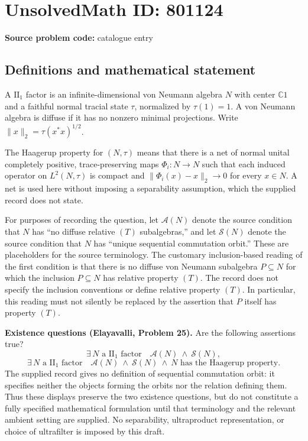 \documentclass[11pt]{article}
\newcommand{\C}{\mathbb{C}}
\begin{document}
\section*{UnsolvedMath ID: 801124}
\textbf{Source problem code:} catalogue entry
\subsection{Definitions and mathematical statement}
A \(\mathrm{II}_1\) factor is an infinite-dimensional von Neumann algebra \(N\) with center \(\C 1\) and a faithful normal tracial state \(\tau\), normalized by \(\tau(1)=1\). A von Neumann algebra is diffuse if it has no nonzero minimal projections. Write \(\|x\|_2=\tau(x^*x)^{1/2}\).

The Haagerup property for \((N,\tau)\) means that there is a net of normal unital completely positive, trace-preserving maps \(\Phi_i:N\to N\) such that each induced operator on \(L^2(N,\tau)\) is compact and \(\|\Phi_i(x)-x\|_2\to0\) for every \(x\in N\). A net is used here without imposing a separability assumption, which the supplied record does not state.

For purposes of recording the question, let \(\mathcal A(N)\) denote the source condition that \(N\) has ``no diffuse relative \((T)\) subalgebras,'' and let \(\mathcal S(N)\) denote the source condition that \(N\) has ``unique sequential commutation orbit.'' These are placeholders for the source terminology. The customary inclusion-based reading of the first condition is that there is no diffuse von Neumann subalgebra \(P\subseteq N\) for which the inclusion \(P\subseteq N\) has relative property \((T)\). The record does not specify the inclusion conventions or define relative property \((T)\). In particular, this reading must not silently be replaced by the assertion that \(P\) itself has property \((T)\).

\textbf{Existence questions (Elayavalli, Problem 25).} Are the following assertions true?
\[
\exists\,N\text{ a }\mathrm{II}_1\text{ factor}\quad
\mathcal A(N)\ \land\ \mathcal S(N),
\]
\[
\exists\,N\text{ a }\mathrm{II}_1\text{ factor}\quad
\mathcal A(N)\ \land\ \mathcal S(N)\ \land\
N\text{ has the Haagerup property}.
\]
The supplied record gives no definition of sequential commutation orbit: it specifies neither the objects forming the orbits nor the relation defining them. Thus these displays preserve the two existence questions, but do not constitute a fully specified mathematical formulation until that terminology and the relevant ambient setting are supplied. No separability, ultraproduct representation, or choice of ultrafilter is imposed by this draft.
\end{document}

